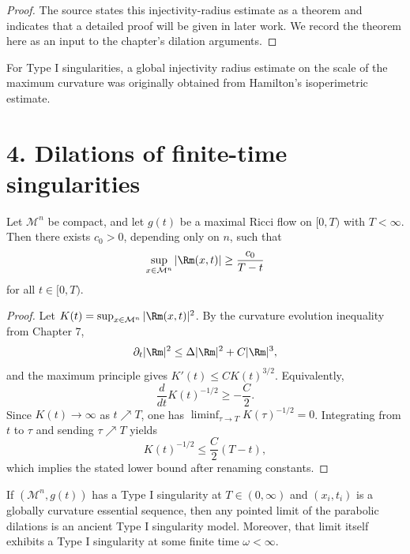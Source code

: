 \begin{proof}
\sketch The source states this injectivity-radius estimate as a theorem and indicates that a detailed proof will be given in later work. We record the theorem here as an input to the chapter's dilation arguments.
\end{proof}

\begin{remark}
\label{ch08-rem-hamilton-injectivity}

For Type I singularities, a global injectivity radius estimate on the scale of the maximum curvature was originally obtained from Hamilton's isoperimetric estimate.
\end{remark}

\section*{4. Dilations of finite-time singularities}

\begin{lemma}
\label{ch08-lem-finite-time-blowup-rate}

Let \(\mathcal M^n\) be compact, and let \(g(t)\) be a maximal Ricci flow on \([0,T)\) with \(T<\infty\). Then there exists \(c_0>0\), depending only on \(n\), such that
\[
\sup_{x\in\mathcal M^n}|\Rm(x,t)|\ge \frac{c_0}{T-t}
\]
for all \(t\in[0,T)\).
\end{lemma}

\begin{proof}
\sketch Let \(K(t)=\sup_{x\in\mathcal M^n}|\Rm(x,t)|^2\). By the curvature evolution inequality from Chapter 7,
\[
\partial_t |\Rm|^2\le \Delta |\Rm|^2+C|\Rm|^3,
\]
and the maximum principle gives \(K'(t)\le C K(t)^{3/2}\). Equivalently,
\[
\frac{d}{dt}K(t)^{-1/2}\ge -\frac C2.
\]
Since \(K(t)\to\infty\) as \(t\nearrow T\), one has \(\liminf_{\tau\to T}K(\tau)^{-1/2}=0\). Integrating from \(t\) to \(\tau\) and sending \(\tau\nearrow T\) yields
\[
K(t)^{-1/2}\le \frac C2(T-t),
\]
which implies the stated lower bound after renaming constants.
\end{proof}

\begin{proposition}
\label{ch08-prop-type-i-limits}

If \((\mathcal M^n,g(t))\) has a Type I singularity at \(T\in(0,\infty)\) and \((x_i,t_i)\) is a globally curvature essential sequence, then any pointed limit of the parabolic dilations is an ancient Type I singularity model. Moreover, that limit itself exhibits a Type I singularity at some finite time \(\omega<\infty\).
\end{proposition}

